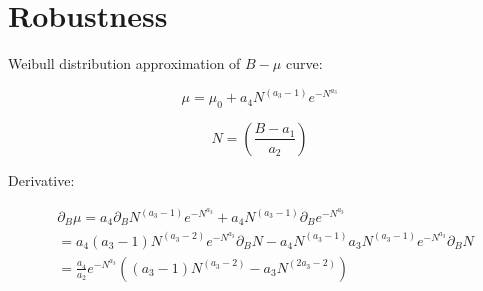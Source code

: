 \newpage
\chapter{Robustness}

\noindent Weibull distribution approximation of $B-\mu$ curve:

\begin{equation} \label{eq:70} 
\mu = \mu_0 + a_4 N^{\left(a_3 - 1\right)} e^{-N^{a_3}}
\end{equation}

\begin{equation} \label{eq:71} 
N = \left( \frac{B - a_1}{a_2} \right)
\end{equation}

\noindent Derivative:

\begin{align*}
&\partial_B \mu = a_4 \partial_B N^{\left(a_3 - 1\right)} e^{-N^{a_3}} + a_4 N^{\left(a_3 - 1\right)} \partial_B e^{-N^{a_3}}\\
&= a_4 \left(a_3 - 1\right) N^{\left(a_3 - 2\right)}  e^{-N^{a_3}} \partial_B N - a_4 N^{\left(a_3 - 1\right)} a_3 N^{\left(a_3 - 1\right)} e^{-N^{a_3}} \partial_B N \\
&= \frac{a_4}{a_2} e^{-N^{a_3}} \left(\left(a_3 -1\right) N^{\left(a_3 - 2\right)} - a_3 N^{\left(2a_3 - 2\right)} \right) 
\end{align*}


